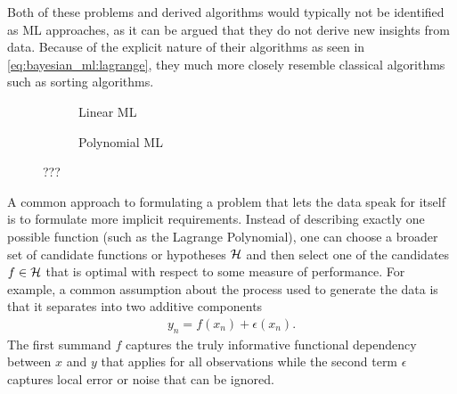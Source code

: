 Both of these problems and derived algorithms would typically not be identified as ML approaches, as it can be argued that they do not derive new insights from data.
Because of the explicit nature of their algorithms as seen in \cref{eq:bayesian_ml:lagrange}, they much more closely resemble classical algorithms such as sorting algorithms.

\begin{figure}[t]
    \begin{subfigure}[b]{\halffigurewidth}
        \centering
        \caption{
            Linear ML
            \label{fig:bayesian_ml:polynomials:linear}
        }
    \end{subfigure}
    \hfill
    \begin{subfigure}[b]{\halffigurewidth}
        \centering
        \caption{
            Polynomial ML
            \label{fig:bayesian_ml:polynomials:polynomial}
        }
    \end{subfigure}
    \caption[ML Interpolation]{
        ???
        \label{fig:bayesian_ml:polynomials:ml}
    }
\end{figure}
A common approach to formulating a problem that lets the data speak for itself is to formulate more implicit requirements.
Instead of describing exactly one possible function (such as the Lagrange Polynomial), one can choose a broader set of candidate functions or hypotheses $\mathcal{H}$ and then select one of the candidates $f \in \mathcal{H}$ that is optimal with respect to some measure of performance.
For example, a common assumption about the process used to generate the data is that it separates into two additive components
\begin{align}
    \label{eq:bayesian_ml:additive_noise}
    y_n = f(x_n) + \epsilon(x_n).
\end{align}
The first summand $f$ captures the truly informative functional dependency between $x$ and $y$ that applies for all observations while the second term $\epsilon$ captures local error or noise that can be ignored.

